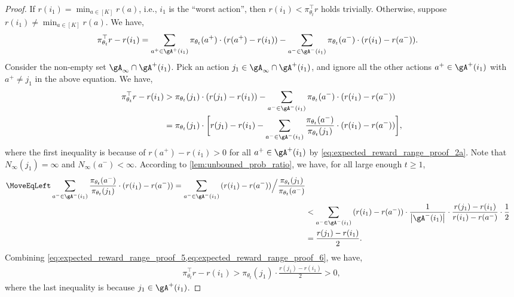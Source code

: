\begin{proof}
If $r(i_1) = \min_{a \in [K]} r(a)$, i.e., $i_1$ is the ``worst action'', then $r(i_1) < \pi_{\theta_t}^\top r$ holds trivially. Otherwise, suppose $r(i_1) \ne \min_{a \in [K]} r(a)$. We have,
\begin{align}
\label{eq:expected_reward_range_proof_4}
    \pi_{\theta_t}^\top r - r(i_1) &= \sum_{a^+ \in \gA^+(i_1)}{ \pi_{\theta_t}(a^+) \cdot (r(a^+) - r(i_1) ) } - \sum_{a^- \in \gA^-(i_1)}{ \pi_{\theta_t}(a^-) \cdot ( r(i_1) - r(a^-)) }.
\end{align}
Consider the non-empty set $\gA_\infty \cap \gA^+(i_1)$. Pick an action $j_1 \in \gA_\infty \cap \gA^+(i_1)$, and ignore all the other actions $a^+ \in \gA^+(i_1)$ with $a^+ \ne j_1$ in the above equation. We have,
\begin{align}
\label{eq:expected_reward_range_proof_5}
    \pi_{\theta_t}^\top r - r(i_1) &> \pi_{\theta_t}(j_1) \cdot (r(j_1) - r(i_1) ) - \sum_{a^- \in \gA^-(i_1)}{ \pi_{\theta_t}(a^-) \cdot ( r(i_1) - r(a^-)) } \\
    &= \pi_{\theta_t}(j_1) \cdot \bigg[ r(j_1) - r(i_1) - \sum_{a^- \in \gA^-(i_1)}{ \frac{ \pi_{\theta_t}(a^-)}{ \pi_{\theta_t}(j_1) } \cdot ( r(i_1) - r(a^-)) } \bigg],
\end{align}
where the first inequality is because of $r(a^+) - r(i_1) > 0$ for all $a^+ \in \gA^+(i_1)$ by \cref{eq:expected_reward_range_proof_2a}. Note that $N_\infty(j_1) = \infty$ and $N_\infty(a^-) < \infty$. According to \cref{lem:unbouned_prob_ratio}, we have, for all large enough $t \ge 1$, 
\begin{align}
\label{eq:expected_reward_range_proof_6}
\MoveEqLeft
    \sum_{a^- \in \gA^-(i_1)}{ \frac{ \pi_{\theta_t}(a^-)}{ \pi_{\theta_t}(j_1) } \cdot ( r(i_1) - r(a^-)) } = \sum_{a^- \in \gA^-(i_1)}{ ( r(i_1) - r(a^-)) \Big/ \frac{ \pi_{\theta_t}(j_1) }{ \pi_{\theta_t}(a^-)} } \\
    &< \sum_{a^- \in \gA^-(i_1)}{ ( r(i_1) - r(a^-)) \cdot \frac{1}{\big| \gA^-(i_1) \big| } \cdot \frac{r(j_1) - r(i_1)}{r(i_1) - r(a^-)} \cdot \frac{1}{2} } \\
    &= \frac{r(j_1) - r(i_1)}{2}.
\end{align}
Combining \cref{eq:expected_reward_range_proof_5,eq:expected_reward_range_proof_6}, we have,
\begin{align}
\label{eq:expected_reward_range_proof_7}
    \pi_{\theta_t}^\top r - r(i_1) > \pi_{\theta_t}(j_1) \cdot \frac{r(j_1) - r(i_1)}{2} > 0,
\end{align}
where the last inequality is because  $j_1 \in \gA^+(i_1)$.


\end{proof}
